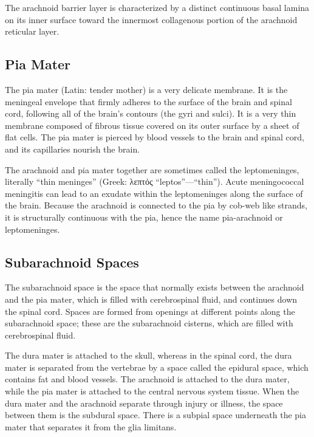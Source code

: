 The arachnoid barrier layer is characterized by a distinct continuous basal lamina on its inner surface toward the innermost collagenous portion of the arachnoid reticular layer.

\hypertarget{pia-mater}{%
\subsection{Pia Mater}\label{pia-mater}}

The pia mater (Latin: tender mother) is a very delicate membrane. It is the meningeal envelope that firmly adheres to the surface of the brain and spinal cord, following all of the brain's contours (the gyri and sulci). It is a very thin membrane composed of fibrous tissue covered on its outer surface by a sheet of flat cells. The pia mater is pierced by blood vessels to the brain and spinal cord, and its capillaries nourish the brain.

The arachnoid and pia mater together are sometimes called the leptomeninges, literally ``thin meninges'' (Greek: λεπτός ``leptos''---``thin''). Acute meningococcal meningitis can lead to an exudate within the leptomeninges along the surface of the brain. Because the arachnoid is connected to the pia by cob-web like strands, it is structurally continuous with the pia, hence the name pia-arachnoid or leptomeninges.

\hypertarget{subarachnoid-spaces}{%
\subsection{Subarachnoid Spaces}\label{subarachnoid-spaces}}

The subarachnoid space is the space that normally exists between the arachnoid and the pia mater, which is filled with cerebrospinal fluid, and continues down the spinal cord. Spaces are formed from openings at different points along the subarachnoid space; these are the subarachnoid cisterns, which are filled with cerebrospinal fluid.

The dura mater is attached to the skull, whereas in the spinal cord, the dura mater is separated from the vertebrae by a space called the epidural space, which contains fat and blood vessels. The arachnoid is attached to the dura mater, while the pia mater is attached to the central nervous system tissue. When the dura mater and the arachnoid separate through injury or illness, the space between them is the subdural space. There is a subpial space underneath the pia mater that separates it from the glia limitans.



